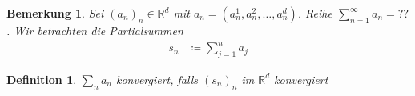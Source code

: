 \documentclass[11pt, twoside, a4paper]{article}
\theoremstyle{plain}
\newtheorem{bemerkung}[blockelement]{Bemerkung}
\newtheorem{definition}[blockelement]{Definition}
\newcommand{\pair}[1]{\left(#1\right)}
\newcommand{\definedas}[0]{\coloneqq}
\newcommand{\R}{\mathbb{R}}
\begin{document}
    \newpage


    \begin{bemerkung}
        \marginnote{[19. Dez]}
        Sei $(a_n)_n\in\R^d$ mit $a_n = \pair{a_n^1, a_n^2, \dots, a_n^d}$. Reihe $\sum_{n=1}^{\infty} a_n = ??$. Wir betrachten die Partialsummen
        \begin{align*}
            s_n &\definedas \sum_{j=1}^{n} a_j
        \end{align*}
    \end{bemerkung}

    \begin{definition}
        $\sum_{n} a_n$ konvergiert, falls $(s_n)_n$ im $\R^d$ konvergiert
    \end{definition}
\end{document}
